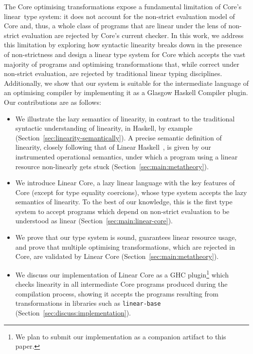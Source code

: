 \documentclass[acmsmall,review,screen]{acmart}
\newcommand{\ROUNDTWO}[1]{{\color{red}#1}}
\begin{document}
The Core optimising transformations expose a fundamental limitation of Core's
\ROUNDTWO{linear} type system: it does not account for the non-strict evaluation model
of Core and, thus, a whole class of programs that are linear under the lens of
non-strict evaluation are rejected by Core's current \ROUNDTWO{checker}.
%
In this work, we address this limitation by exploring how syntactic linearity
breaks down in the presence of non-strictness and design a linear type
system for Core which accepts the vast majority of programs and optimising
transformations that, while correct under non-strict evaluation, are rejected
by traditional linear typing disciplines.
%
%
Additionally, we show \ROUNDTWO{that} our system
%
is suitable for the intermediate language of an
optimising compiler by implementing it as a Glasgow Haskell Compiler plugin.
%
Our contributions are as follows:
%
\begin{itemize}

\item We \ROUNDTWO{illustrate} the \ROUNDTWO{lazy semantics} of linearity, in
contrast to the \ROUNDTWO{traditional} syntactic \ROUNDTWO{understanding
of} linearity, in Haskell, by example (Section~\ref{sec:linearity-semantically}).
%
A precise \ROUNDTWO{semantic definition of} linearity, \ROUNDTWO{closely
following that of Linear Haskell~\cite{cite:linearhaskell}}, is given by
our instrumented operational semantics, under which a program using a
linear resource non-linearly gets stuck
(Section~\ref{sec:main:metatheory}).

\item We introduce Linear Core, a \ROUNDTWO{lazy} linear language with
the key features of Core (except for type equality coercions), whose type
system \ROUNDTWO{accepts the lazy} semantics of linearity. To the best of our
knowledge, this is the first type system \ROUNDTWO{to accept programs
which depend on non-strict evaluation to be understood as linear}
(Section~\ref{sec:main:linear-core}).

\item We prove that our type system is sound, guarantees linear resource usage, and
    prove that multiple optimising transformations, which are rejected in Core,
        are validated by Linear Core (Section~\ref{sec:main:metatheory}).

\item We discuss our implementation of Linear Core as a GHC
  plugin\footnote{We plan to submit our implementation as a companion
    artifact to this paper.} which checks linearity in
all intermediate Core programs produced during the compilation process, showing
it accepts the programs resulting from transformations in libraries such as
\texttt{linear-base} (Section~\ref{sec:discuss:implementation}).

\end{itemize}
\end{document}
